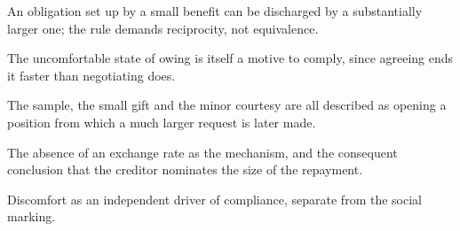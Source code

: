 

\begin{distilled}
  \item An obligation set up by a small benefit can be discharged by a substantially larger one; the rule demands reciprocity, not equivalence.
  \item The uncomfortable state of owing is itself a motive to comply, since agreeing ends it faster than negotiating does.
  \item The sample, the small gift and the minor courtesy are all described as opening a position from which a much larger request is later made.
\end{distilled}

\begin{unique}
  \item The absence of an exchange rate as the mechanism, and the consequent conclusion that the creditor nominates the size of the repayment.
  \item Discomfort as an independent driver of compliance, separate from the social marking.
\end{unique}
